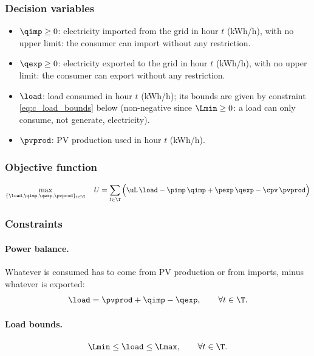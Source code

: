 \subsubsection{Decision variables}
\begin{itemize}
    \item $\qimp \geq 0$: electricity imported from the grid in hour $t$ (kWh/h), with no
    upper limit: the consumer can import without any restriction.
    \item $\qexp \geq 0$: electricity exported to the grid in hour $t$ (kWh/h), with no
    upper limit: the consumer can export without any restriction.
    \item $\load$: load consumed in hour $t$ (kWh/h); its bounds are given by constraint
    \eqref{eq:c_load_bounds} below (non-negative since $\Lmin \geq 0$: a load can only
    consume, not generate, electricity).
    \item $\pvprod$: PV production used in hour $t$ (kWh/h).
\end{itemize}

\subsubsection{Objective function}
\begin{equation}
    \max_{\{\load, \qimp, \qexp, \pvprod\}_{t \in \T}} \quad
    U = \sum_{t \in \T} \Big( \uL \, \load - \pimp \, \qimp + \pexp \, \qexp - \cpv \, \pvprod \Big)
    \label{eq:daily_net_utility}
\end{equation}

\subsubsection{Constraints}

\paragraph{Power balance.}
Whatever is consumed has to come from PV production or from imports, minus whatever is
exported:
\begin{equation}
    \load = \pvprod + \qimp - \qexp, \qquad \forall t \in \T. \label{eq:c_balance}
\end{equation}

\paragraph{Load bounds.}
\begin{equation}
    \Lmin \leq \load \leq \Lmax, \qquad \forall t \in \T. \label{eq:c_load_bounds}
\end{equation}

